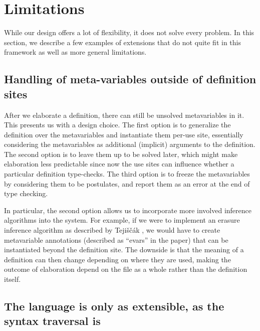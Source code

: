 \hypertarget{sec:limitations}{%
\section{Limitations}\label{sec:limitations}}

While our design offers a lot of flexibility, it does not solve every
problem. In this section, we describe a few examples of extensions that
do not quite fit in this framework as well as more general limitations.

\hypertarget{handling-of-meta-variables-outside-of-definition-sites}{%
\subsection{Handling of meta-variables outside of definition
sites}\label{handling-of-meta-variables-outside-of-definition-sites}}

After we elaborate a definition, there can still be unsolved
metavariables in it. This presents us with a design choice. The first
option is to generalize the definition over the metavariables and
instantiate them per-use site, essentially considering the metavariables
as additional (implicit) arguments to the definition. The second option
is to leave them up to be solved later, which might make elaboration
less predictable since now the use sites can influence whether a
particular definition type-checks. The third option is to freeze the
metavariables by considering them to be postulates, and report them as
an error at the end of type checking.

In particular, the second option allows us to incorporate more involved
inference algorithms into the system. For example, if we were to
implement an erasure inference algorithm as described by
Tejiščák \cite{tejiscakDependentlyTypedCalculus2020}, we would have to create
metavariable annotations (described as ``evars'' in the paper) that can
be instantiated beyond the definition site. The downside is that the
meaning of a definition can then change depending on where they are
used, making the outcome of elaboration depend on the file as a whole
rather than the definition itself.

\hypertarget{the-language-is-only-as-extensible-as-the-syntax-traversal-is}{%
\subsection{The language is only as extensible, as the syntax traversal
is}\label{the-language-is-only-as-extensible-as-the-syntax-traversal-is}}

